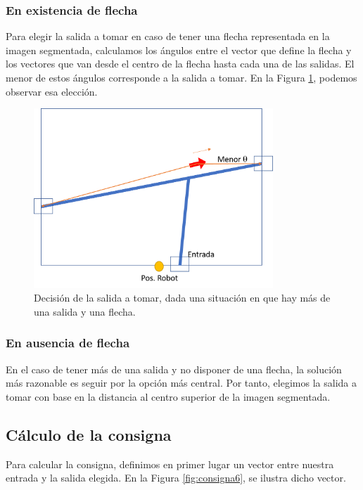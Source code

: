 \documentclass{article}
\begin{document}
        \subsubsection{En existencia de flecha} 
            Para elegir la salida a tomar en caso de tener una flecha representada en la imagen segmentada, calculamos los ángulos entre el vector que define la flecha y los vectores que van desde el centro de la flecha hasta cada una de las salidas. El menor de estos ángulos corresponde a la salida a tomar. En la Figura \ref{fig:consigna5}, podemos observar esa elección.

            \begin{figure}[H]
                \centering
                \includegraphics[width=9cm]{figures/consigna5.png}
                \caption{Decisión de la salida a tomar, dada una situación en que hay más de una salida y una flecha.}
                \label{fig:consigna5}
            \end{figure}
        
        \subsubsection{En ausencia de flecha}
            En el caso de tener más de una salida y no disponer de una flecha, la solución más razonable es seguir por la opción más central. Por tanto, elegimos la salida a tomar con base en la distancia al centro superior de la imagen segmentada.

    \subsection{Cálculo de la consigna}
        Para calcular la consigna, definimos en primer lugar un vector entre nuestra entrada y la salida elegida. En la Figura \ref{fig:consigna6}, se ilustra dicho vector.
\end{document}
